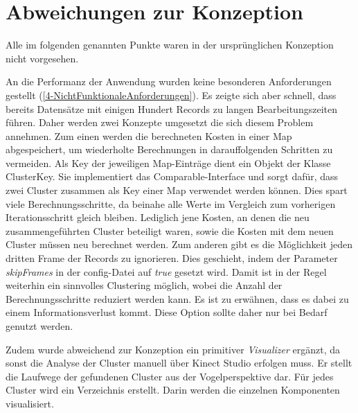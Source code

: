 \clearpage
\section{Abweichungen zur Konzeption}
\label{5-AbweichungenKonzeption}
Alle im folgenden genannten Punkte waren in der ursprünglichen Konzeption nicht vorgesehen.

An die Performanz der Anwendung wurden keine besonderen Anforderungen gestellt
(\autoref{4-NichtFunktionaleAnforderungen}).
Es zeigte sich aber schnell, dass bereits Datensätze mit einigen Hundert Records zu langen Bearbeitungszeiten führen.
Daher werden zwei Konzepte umgesetzt die sich diesem Problem annehmen.
Zum einen werden die berechneten Kosten in einer Map abgespeichert,
um wiederholte Berechnungen in darauffolgenden Schritten zu vermeiden.
Als Key der jeweiligen Map-Einträge dient ein Objekt der Klasse ClusterKey.
Sie implementiert das Comparable-Interface und sorgt dafür,
dass zwei Cluster zusammen als Key einer Map verwendet werden können.
Dies spart viele Berechnungsschritte,
da beinahe alle Werte im Vergleich zum vorherigen Iterationsschritt gleich bleiben.
Lediglich jene Kosten, an denen die neu zusammengeführten Cluster beteiligt waren,
sowie die Kosten mit dem neuen Cluster müssen neu berechnet werden.
Zum anderen gibt es die Möglichkeit jeden dritten Frame der Records zu ignorieren.
Dies geschieht, indem der Parameter \emph{skipFrames} in der config-Datei auf \emph{true} gesetzt wird.
Damit ist in der Regel weiterhin ein sinnvolles Clustering möglich,
wobei die Anzahl der Berechnungsschritte reduziert werden kann.
Es ist zu erwähnen, dass es dabei zu einem Informationsverlust kommt.
Diese Option sollte daher nur bei Bedarf genutzt werden.

Zudem wurde abweichend zur Konzeption ein primitiver \emph{Visualizer} ergänzt,
da sonst die Analyse der Cluster manuell über Kinect Studio erfolgen muss.
Er stellt die Laufwege der gefundenen Cluster aus der Vogelperspektive dar.
Für jedes Cluster wird ein Verzeichnis erstellt.
Darin werden die einzelnen Komponenten visualisiert.